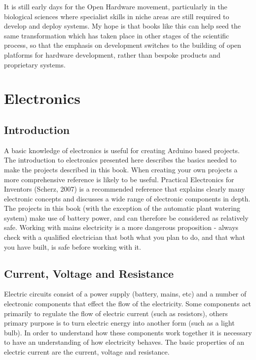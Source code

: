 \documentclass[
]{book}
\begin{document}
It is still early days for the Open Hardware movement, particularly in the biological sciences where specialist skills in niche areas are still required to develop and deploy systems. My hope is that books like this can help seed the same transformation which has taken place in other stages of the scientific process, so that the emphasis on development switches to the building of open platforms for hardware development, rather than bespoke products and proprietary systems.

\chapter{Electronics}\label{electronics}

\section{Introduction}\label{introduction-1}

A basic knowledge of electronics is useful for creating Arduino based projects. The introduction to electronics presented here describes the basics needed to make the projects described in this book. When creating your own projects a more comprehensive reference is likely to be useful. Practical Electronics for Inventors (Scherz, 2007) is a recommended reference that explains clearly many electronic concepts and discusses a wide range of electronic components in depth.
The projects in this book (with the exception of the automatic plant watering system) make use of battery power, and can therefore be considered as relatively safe. Working with mains electricity is a more dangerous proposition - always check with a qualified electrician that both what you plan to do, and that what you have built, is safe before working with it.

\section{Current, Voltage and Resistance}\label{current-voltage-and-resistance}

Electric circuits consist of a power supply (battery, mains, etc) and a number of electronic components that effect the flow of the electricity. Some components act primarily to regulate the flow of electric current (such as resistors), others primary purpose is to turn electric energy into another form (such as a light bulb). In order to understand how these components work together it is necessary to have an understanding of how electricity behaves. The basic properties of an electric current are the current, voltage and resistance.
\end{document}
